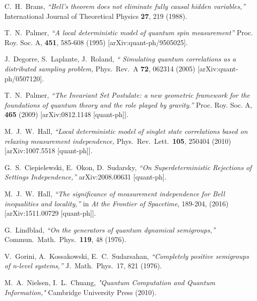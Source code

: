 \documentclass[11pt,twoside,A4]{article}
\begin{document}
\begin{thebibliography}{99}
{   C.~H.~Brans, {\sl ``Bell's theorem does not eliminate fully causal hidden variables,''} International Journal of Theoretical Physics {\bf 27}, 219 (1988).
  
  T.~N.~Palmer,
  {\sl ``A local deterministic model of quantum spin measurement''}
  Proc. Roy. Soc. A, {\bf 451}, 585-608 (1995) 	[arXiv:quant-ph/9505025]. 



J.~Degorre, S.~Laplante, J.~Roland,  {\sl ``  Simulating quantum correlations as a distributed sampling problem,} Phys.\ Rev.\ A {\bf 72}, 062314 (2005) [arXiv:quant-ph/0507120].

  T.~N.~Palmer,
  {\sl ``The Invariant Set Postulate: a new geometric framework for the foundations of quantum theory and the role played by gravity.''}
  Proc. Roy. Soc. A, {\bf 465} (2009) 	[arXiv:0812.1148 [quant-ph]]. 

 M.~J.~W.~Hall, {\sl ``Local deterministic model of singlet state correlations based on relaxing measurement independence,} Phys.\ Rev.\ Lett.\ {\bf 105}, 250404 (2010) 
[arXiv:1007.5518 [quant-ph]].


 G.~S.~Ciepielewski, E.~Okon, D.~Sudarsky, {\sl ``On Superdeterministic Rejections of Settings Independence,''} 	arXiv:2008.00631 [quant-ph].

     M.~J.~W.~Hall, {\sl ``The significance of measurement independence for Bell inequalities and locality,''} in {\sl At the Frontier of Spacetime},  189-204, (2016) [arXiv:1511.00729 [quant-ph]].

 

  
    

G.~Lindblad, {\sl ``On the generators of quantum dynamical semigroups,''} Commun.\ Math.\ Phys.\ {\bf 119}, 48 (1976).


 V.~Gorini, A.~Kossakowski, E.~C.~Sudarsahan, {\sl ``Completely positive semigroups
of n-level systems,''} J.\ Math.\ Phys.\ 17, 821 (1976).

M.~A.~Nielsen, I.~L.~Chuang, {\sl "Quantum Computation and Quantum Information,"} Cambridge University Press (2010). 

}
\end{thebibliography}
\end{document}
